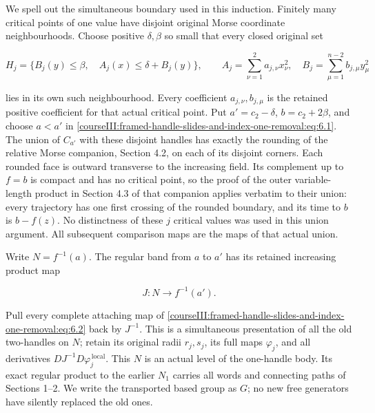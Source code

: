 We spell out the simultaneous boundary used in this induction. Finitely many critical points of one value have disjoint original Morse coordinate neighbourhoods. Choose positive \(\delta,\beta\) so small that every closed original set

\begin{equation}
H_j=\{B_j(y)\leq\beta,\quad
             A_j(x)\leq\delta+B_j(y)\},
 \qquad
 A_j=\sum_{\nu=1}^{2}a_{j,\nu}x_\nu^2,\quad
 B_j=\sum_{\mu=1}^{n-2}b_{j,\mu}y_\mu^2
 \label{courseIII:framed-handle-slides-and-index-one-removal:eq:6.2}
\end{equation}

lies in its own such neighbourhood. Every coefficient \(a_{j,\nu},b_{j,\mu}\) is the retained positive coefficient for that actual critical point. Put \(a'=c_2-\delta\), \(b=c_2+2\beta\), and choose \(a<a'\) in \eqref{courseIII:framed-handle-slides-and-index-one-removal:eq:6.1}. The union of \(C_{a'}\) with these disjoint handles has exactly the rounding of the relative Morse companion, Section 4.2, on each of its disjoint corners. Each rounded face is outward transverse to the increasing field. Its complement up to \(f=b\) is compact and has no critical point, so the proof of the outer variable-length product in Section 4.3 of that companion applies verbatim to their union: every trajectory has one first crossing of the rounded boundary, and its time to \(b\) is \(b-f(z)\). No distinctness of these \(j\) critical values was used in this union argument. All subsequent comparison maps are the maps of that actual union.

Write \(N=f^{-1}(a)\). The regular band from \(a\) to \(a'\) has its retained increasing product map

\begin{equation}
J:N\longrightarrow f^{-1}(a').
 \label{courseIII:framed-handle-slides-and-index-one-removal:eq:6.3}
\end{equation}

Pull every complete attaching map of \eqref{courseIII:framed-handle-slides-and-index-one-removal:eq:6.2} back by \(J^{-1}\). This is a simultaneous presentation of all the old two-handles on \(N\); retain its original radii \(r_j,s_j\), its full maps \(\varphi_j\), and all derivatives \(DJ^{-1}D\varphi_j^{\,\mathrm{local}}\). This \(N\) is an actual level of the one-handle body. Its exact regular product to the earlier \(N_1\) carries all words and connecting paths of Sections 1--2. We write the transported based group as \(G\); no new free generators have silently replaced the old ones.

